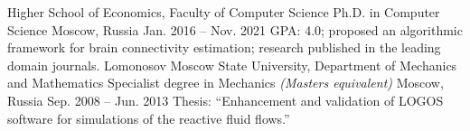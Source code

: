 \begin{cventries}
  \cventry
    {Higher School of Economics, Faculty of Computer Science}
    {Ph.D. in Computer Science}
    {Moscow, Russia}
    {Jan. 2016 -- Nov. 2021}
    {GPA: 4.0; proposed an algorithmic framework for brain connectivity estimation; research published in the leading domain journals.}
  \cventry
    {Lomonosov Moscow State University, Department of Mechanics and Mathematics}
    {Specialist degree in Mechanics \emph{(Masters equivalent)}}
    {Moscow, Russia}
    {Sep. 2008 -- Jun. 2013}
    {Thesis: ``Enhancement and validation of LOGOS software for simulations of the reactive fluid flows.''}
\end{cventries}
